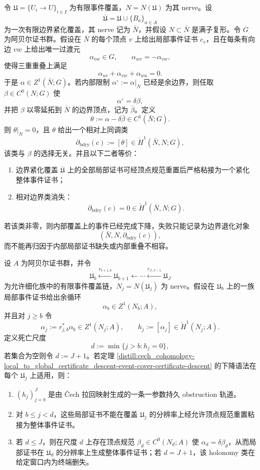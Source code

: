 \begin{theorem}[紧化事件覆盖的相对边界退化分类]\label{distill:grothendieck-compactified_boundary_degeneration_control-event-cover-relative-boundary-classification}
令 \(\mathfrak U=\{U_i\to U\}_{i\in I}\) 为有限事件覆盖，\(N=N(\mathfrak U)\) 为其 nerve。设
\[
\overline{\mathfrak U}=\mathfrak U\cup\{B_a\}_{a\in A}
\]
为一次有限边界紧化覆盖，其 nerve 记为 \(\bar N\)，并假设 \(N\subset\bar N\) 是满子复形。令 \(G\) 为阿贝尔证书群。假设在 \(\bar N\) 的每个顶点 \(v\) 上给出局部事件证书 \(c_v\)，且在每条有向边 \(vw\) 上给出唯一过渡元
\[
\alpha_{vw}\in G,\qquad \alpha_{wv}=-\alpha_{vw},
\]
使得三重重叠上满足
\[
\alpha_{uv}+\alpha_{vw}+\alpha_{wu}=0.
\]
于是 \(\alpha\in Z^1(\bar N;G)\)。若内部限制 \(\alpha^\circ:=\alpha|_N\) 已经是余边界，则任取 \(\beta\in C^0(N;G)\) 使
\[
\alpha^\circ=\delta\beta,
\]
并把 \(\beta\) 以零延拓到 \(\bar N\) 的边界顶点，记为 \(\bar\beta\)。定义
\[
\theta:=\alpha-\delta\bar\beta\in C^1(\bar N;G).
\]
则 \(\theta|_N=0\)，且 \(\theta\) 给出一个相对上同调类
\[
\partial_{\mathrm{bdry}}(c):=[\theta]\in \check H^1(\bar N,N;G),
\]
该类与 \(\beta\) 的选择无关。并且以下二者等价：
\begin{enumerate}
  \item 边界紧化覆盖 \(\overline{\mathfrak U}\) 上的全部局部证书可经顶点规范重置后严格粘接为一个紧化整体事件证书；
  \item 相对边界类消失：
  \[
  \partial_{\mathrm{bdry}}(c)=0\in\check H^1(\bar N,N;G).
  \]
\end{enumerate}
若该类非零，则内部覆盖上的事件已经完成下降，失败只能记录为边界退化对象
\[
(\bar N,N,\partial_{\mathrm{bdry}}(c)),
\]
而不能再归因于内部局部证书缺失或内部重叠不相容。
\end{theorem}
\begin{theorem}\label{thm:distill-physical-event-cover-holonomy-persistence}
设 \(A\) 为阿贝尔证书群，并令
\[
\mathfrak U_b\xleftarrow{r_{b+1,b}}\mathfrak U_{b+1}\xleftarrow{}\cdots\xleftarrow{r_{J,J-1}}\mathfrak U_J
\]
为允许细化族中的有限事件覆盖链，\(N_j=N(\mathfrak U_j)\) 为 nerve。假设在 \(\mathfrak U_b\) 上的一族局部事件证书给出余循环
\[
\alpha_b\in Z^1(N_b;A),
\]
并且对 \(j\ge b\) 令
\[
\alpha_j:=r_{j,b}^{\ast}\alpha_b\in Z^1(N_j;A),
\qquad h_j:=[\alpha_j]\in\check H^1(N_j;A).
\]
定义死亡尺度
\[
d:=\min\{j>b:h_j=0\},
\]
若集合为空则令 \(d:=J+1\)。若定理 \ref{distill:cech_cohomology-local_to_global_certificate_descent-event-cover-certificate-descent} 的下降语法在每个 \(\mathfrak U_j\) 上适用，则：
\begin{enumerate}
  \item \((h_j)_{j=b}^J\) 是由 \v Cech 拉回映射生成的一条一参数持久 obstruction 轨道。
  \item 对 \(b\le j<d\)，这些局部证书不能在覆盖 \(\mathfrak U_j\) 的分辨率上经允许顶点规范重置粘接为整体事件证书。
  \item 若 \(d\le J\)，则在尺度 \(d\) 上存在顶点规范 \(\beta_d\in C^0(N_d;A)\) 使 \(\alpha_d=\delta\beta_d\)，从而局部证书在 \(\mathfrak U_d\) 的分辨率上生成整体事件证书；若 \(d=J+1\)，该 holonomy 类在给定窗口内为终端删失。
\end{enumerate}
\end{theorem}
